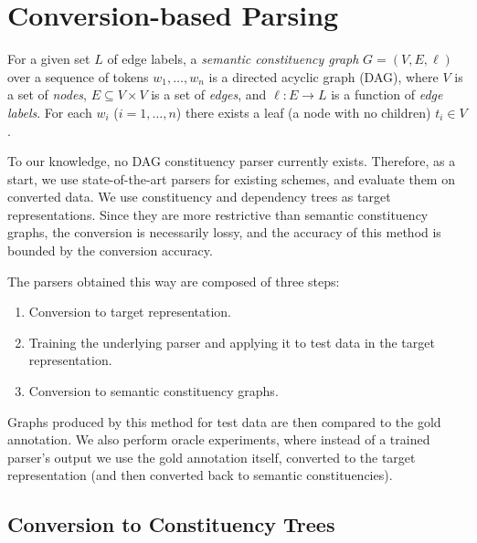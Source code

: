 \documentclass[11pt]{article}
\begin{document}


\section{Conversion-based Parsing}\label{sec:conversion_approach}

For a given set $L$ of edge labels, a \textit{semantic constituency graph} $G=(V,E, \ell)$ over a sequence of tokens $w_1, \ldots, w_n$ is a directed acyclic graph (DAG), where $V$ is a set of \textit{nodes}, $E \subseteq V\times V$ is a set of \textit{edges}, and $\ell:E\to L$ is a function of \textit{edge labels}. For each $w_i$ ($i=1, \ldots, n$) there exists a leaf (a node with no children) $t_i \in V$.

To our knowledge, no DAG constituency parser currently exists.
Therefore, as a start, we use state-of-the-art parsers for existing schemes, and evaluate them on converted data. We use constituency and dependency trees as target representations. Since they are more restrictive than semantic constituency graphs, the conversion is necessarily lossy, and the accuracy of this method is bounded by the conversion accuracy.

The parsers obtained this way are composed of three steps:
\begin{enumerate}
\item Conversion to target representation.
\item Training the underlying parser and applying it to test data in the target representation.
\item Conversion to semantic constituency graphs.
\end{enumerate}
Graphs produced by this method for test data are then compared to the gold annotation.
We also perform oracle experiments, where instead of a trained parser's output we use the gold annotation itself, converted to the target representation (and then converted back to semantic constituencies).


\subsection{Conversion to Constituency Trees}
\end{document}
